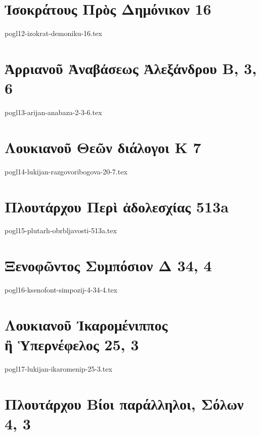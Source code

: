 \documentclass[a4paper,12pt,twoside]{report}
\begin{document}
\chapter[Ἰσοκράτους Πρὸς Δημόνικον]{\textgreek[variant=ancient]{Ἰσοκράτους Πρὸς Δημόνικον} 16}

{pogl12-izokrat-demoniku-16.tex}

\chapter[Ἀρριανοῦ Ἀναβάσεως Ἀλεξάνδρου Β]{\textgreek[variant=ancient]{Ἀρριανοῦ Ἀναβάσεως Ἀλεξάνδρου Β,} 3, 6}

{pogl13-arijan-anabaza-2-3-6.tex}

\chapter[Λουκιανοῦ Θεῶν διάλογοι]{\textgreek[variant=ancient]{Λουκιανοῦ Θεῶν διάλογοι Κ} 7}

{pogl14-lukijan-razgovoribogova-20-7.tex}

\chapter[Πλουτάρχου Περὶ ἀδολεσχίας]{\textgreek[variant=ancient]{Πλουτάρχου Περὶ ἀδολεσχίας} 513a}

{pogl15-plutarh-obrbljavosti-513a.tex}

\chapter[Ξενοφῶντος Συμπόσιον Δ]{\textgreek[variant=ancient]{Ξενοφῶντος Συμπόσιον Δ} 34, 4}

{pogl16-ksenofont-simpozij-4-34-4.tex}

\chapter[Λουκιανοῦ Ἰκαρομένιππος]{\textgreek[variant=ancient]{Λουκιανοῦ Ἰκαρομένιππος \\ἢ Ὑπερνέφελος} 25, 3}

{pogl17-lukijan-ikaromenip-25-3.tex}

\chapter[Πλουτάρχου Σόλων]{\textgreek[variant=ancient]{Πλουτάρχου Βίοι παράλληλοι, Σόλων} 4, 3}
\end{document}
